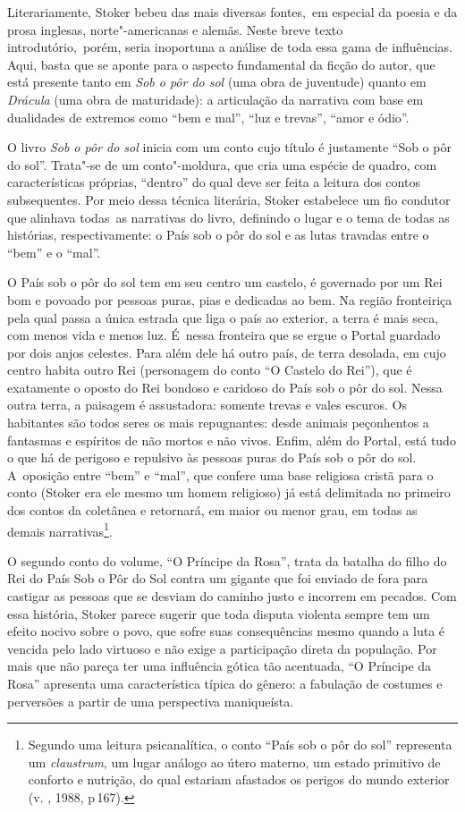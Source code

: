 Literariamente, Stoker bebeu das mais diversas fontes,~em especial da
poesia e da prosa inglesas, norte"-americanas e alemãs. Neste breve texto
introdutório,~porém, seria inoportuna a análise de toda essa gama de
influências. Aqui, basta que se aponte para o aspecto fundamental da
ficção do autor, que está presente tanto em \emph{Sob o pôr do sol} (uma
obra de juventude) quanto em \emph{Drácula} (uma obra de maturidade): a
articulação da narrativa com base em dualidades de extremos como ``bem e
mal'', ``luz e trevas'', ``amor e ódio''.

O livro \emph{Sob o pôr do sol} inicia com um conto cujo título é
justamente ``Sob o pôr do sol''. Trata"-se de um conto"-moldura, que cria
uma espécie de quadro, com características próprias, ``dentro'' do qual
deve ser feita a leitura dos contos subsequentes. Por meio dessa técnica
literária, Stoker estabelece um fio condutor que alinhava todas~as
narrativas do livro, definindo o lugar e o tema de todas as histórias,
respectivamente: o País sob o pôr do sol e as lutas travadas entre o
``bem'' e o ``mal''.

O País sob o pôr do sol tem em seu centro um castelo, é governado por um
Rei bom e povoado por pessoas puras, pias e dedicadas ao bem. Na região
fronteiriça pela qual passa a única estrada que liga o país ao exterior, a
terra é mais seca, com menos vida e menos luz. É~nessa fronteira que se
ergue o Portal guardado por dois anjos celestes. Para além dele há outro
país, de terra desolada, em cujo centro habita outro Rei (personagem do
conto ``O Castelo do Rei''), que é exatamente o oposto do Rei bondoso e
caridoso do País sob o pôr do sol. Nessa outra terra, a paisagem é
assustadora: somente trevas e vales escuros. Os habitantes são todos
seres os mais repugnantes: desde animais peçonhentos a fantasmas e
espíritos de não mortos e não vivos. Enfim, além do Portal, está tudo o
que há de perigoso e repulsivo às pessoas puras do País sob o pôr do
sol. A~oposição entre ``bem'' e ``mal'', que confere uma base religiosa
cristã para o conto (Stoker era ele mesmo um homem religioso) já está
delimitada no primeiro dos contos da coletânea e retornará, em maior ou
menor grau, em todas as demais narrativas\footnote{Segundo uma leitura psicanalítica, o conto
``País sob o pôr do sol'' representa um \emph{claustrum}, um lugar
análogo ao útero materno, um estado primitivo de conforto e nutrição, do
qual estariam afastados os perigos do mundo exterior (v. , 1988,
p\,167).}.

O segundo conto do volume, ``O Príncipe da Rosa'', trata da batalha do
filho do Rei do País Sob o Pôr do Sol contra um gigante que foi enviado
de fora para castigar as pessoas que se desviam do caminho justo e
incorrem em pecados. Com essa história, Stoker parece sugerir que toda
disputa violenta sempre tem um efeito nocivo sobre o povo, que sofre
suas consequências mesmo quando a luta é vencida pelo lado virtuoso e
não exige a participação direta da população. Por mais que não pareça
ter uma influência gótica tão acentuada, ``O Príncipe da Rosa''
apresenta uma característica típica do gênero: a fabulação de costumes e
perversões a partir de uma perspectiva maniqueísta.

